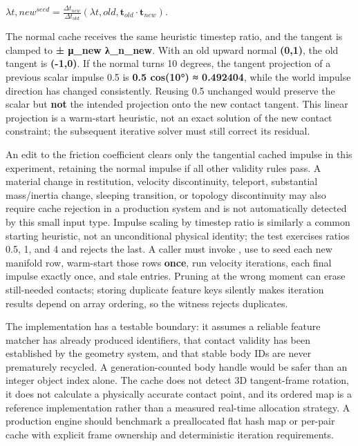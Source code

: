 \(\lambda{t,new}^{seed} = \frac{\Delta t_{new}}{\Delta t_{old}} \left(\lambda{t,old},\mathbf t_{old}\cdot\mathbf t_{new}\right).\)

The normal cache receives the same heuristic timestep ratio, and the tangent is clamped to \textbf{± μ\_new λ\_n\_new}. With an old upward normal \textbf{(0,1)}, the old tangent is \textbf{(-1,0)}. If the normal turns 10 degrees, the tangent projection of a previous scalar impulse 0.5 is \textbf{0.5 cos(10°) ≈ 0.492404}, while the world impulse direction has changed consistently. Reusing 0.5 unchanged would preserve the scalar but \textbf{not} the intended projection onto the new contact tangent. This linear projection is a warm-start heuristic, not an exact solution of the new contact constraint; the subsequent iterative solver must still correct its residual.

An edit to the friction coefficient clears only the tangential cached impulse in this experiment, retaining the normal impulse if all other validity rules pass. A material change in restitution, velocity discontinuity, teleport, substantial mass/inertia change, sleeping transition, or topology discontinuity may also require cache rejection in a production system and is not automatically detected by this small input type. Impulse scaling by timestep ratio is similarly a common starting heuristic, not an unconditional physical identity; the test exercises ratios 0.5, 1, and 4 and rejects the last. A caller must invoke , use  to seed each new manifold row, warm-start those rows \textbf{once}, run velocity iterations,  each final impulse exactly once, and  stale entries. Pruning at the wrong moment can erase still-needed contacts; storing duplicate feature keys silently makes iteration results depend on array ordering, so the witness rejects duplicates.

The implementation has a testable boundary: it assumes a reliable feature matcher has already produced identifiers, that contact validity has been established by the geometry system, and that stable body IDs are never prematurely recycled. A generation-counted body handle would be safer than an integer object index alone. The cache does not detect 3D tangent-frame rotation, it does not calculate a physically accurate contact point, and its ordered map is a reference implementation rather than a measured real-time allocation strategy. A production engine should benchmark a preallocated flat hash map or per-pair cache with explicit frame ownership and deterministic iteration requirements.

